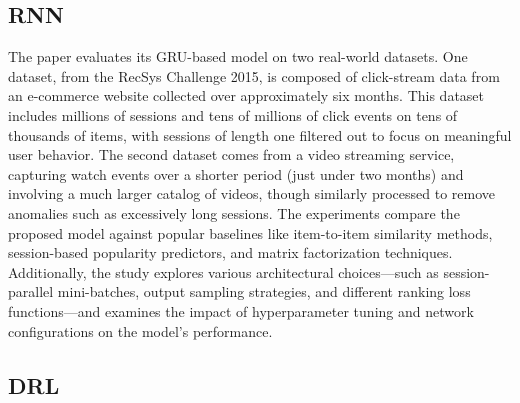 \documentclass{ieeetj}
\begin{document}
\subsection{RNN\cite{hidasi2015session}}
The paper evaluates its GRU-based model on two real-world datasets. One dataset, from the RecSys Challenge 2015, is composed of click-stream data from an e-commerce website collected over approximately six months. This dataset includes millions of sessions and tens of millions of click events on tens of thousands of items, with sessions of length one filtered out to focus on meaningful user behavior. The second dataset comes from a video streaming service, capturing watch events over a shorter period (just under two months) and involving a much larger catalog of videos, though similarly processed to remove anomalies such as excessively long sessions. The experiments compare the proposed model against popular baselines like item-to-item similarity methods, session-based popularity predictors, and matrix factorization techniques. Additionally, the study explores various architectural choices—such as session-parallel mini-batches, output sampling strategies, and different ranking loss functions—and examines the impact of hyperparameter tuning and network configurations on the model's performance.


\subsection{DRL\cite{zheng_drn_2018}}
\end{document}
